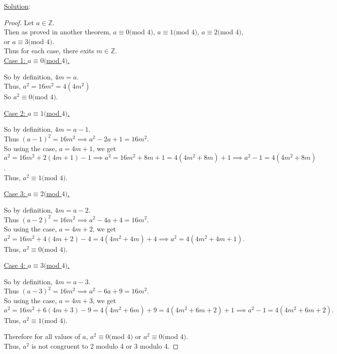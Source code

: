 \documentclass{article} %
\begin{document}
\underline{Solution}: 
\begin{addmargin}[1em]{0em}
\begin{proof}
Let $a \in \mathbb{Z}$.
\\Then as proved in another theorem, $a \equiv 0($mod $4)$, $a \equiv 1($mod $4)$, $a \equiv 2($mod $4)$, or $a \equiv 3($mod $4)$.
\\Thus for each case, there exits $m \in \mathbb{Z}$.
\\ \underline{Case 1: $a \equiv 0($mod $4)$.}
\begin{addmargin}[1em]{0em}
So by definition, $4m = a$.
\\Thus, $a^2 = 16m^2 = 4(4m^2)$
\\So $a^2 \equiv 0($mod $4)$.
\end{addmargin}
\underline{Case 2: $a \equiv 1($mod $4)$.}
\begin{addmargin}[1em]{0em}
So by definition, $4m = a-1$.
\\Thus $(a-1)^2 = 16m^2 \implies a^2 - 2a + 1 = 16m^2$.
\\So using the case, $a = 4m + 1$, we get $a^2 = 16m^2 + 2(4m + 1) - 1 \implies a^2 = 16m^2 + 8m + 1 = 4(4m^2 + 8m) + 1 \implies a^2 - 1 = 4(4m^2 + 8m)$.
\\Thus, $a^2 \equiv 1($mod $4)$.
\end{addmargin}
\underline{Case 3: $a \equiv 2($mod $4)$.}
\begin{addmargin}[1em]{0em}
So by definition, $4m = a-2$.
\\Thus $(a-2)^2 = 16m^2 \implies a^2 - 4a + 4 = 16m^2$.
\\So using the case, $a = 4m + 2$, we get $a^2 = 16m^2 + 4(4m + 2) - 4 = 4(4m^2 + 4m) + 4 \implies a^2 = 4(4m^2 + 4m + 1)$.
\\Thus, $a^2 \equiv 0($mod $ 4)$.
\end{addmargin}
\underline{Case 4: $a \equiv 3($mod $4)$.}
\begin{addmargin}[1em]{0em}
So by definition, $4m = a-3$.
\\Thus $(a-3)^2 = 16m^2 \implies a^2 - 6a + 9 = 16m^2$.
\\So using the case, $a = 4m + 3$, we get $a^2 = 16m^2 + 6(4m + 3) - 9 = 4(4m^2 + 6m) + 9 = 4(4m^2 + 6m + 2) + 1 \implies a^2 - 1 = 4(4m^2 + 6m + 2).$
\\Thus, $a^2 \equiv 1 ($mod $4)$.
\end{addmargin}
Therefore for all values of $a$, $a^2 \equiv 0($mod $4)$ or $a^2 \equiv 0($mod $4)$.
\\Thus, $a^2$ is not congruent to 2 modulo 4 or 3 modulo 4.
\end{proof}
\end{addmargin}
\end{document}
